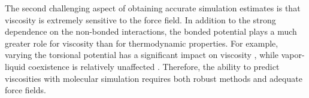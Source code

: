 \documentclass[preprint,review,12pt]{elsarticle}
\begin{document}
	The second challenging aspect of obtaining accurate simulation estimates is that viscosity is extremely sensitive to the force field. In addition to the strong dependence on the non-bonded interactions, the bonded potential plays a much greater role for viscosity than for thermodynamic properties. For example, varying the torsional potential has a significant impact on viscosity \cite{Nieto2006}, while vapor-liquid coexistence is relatively unaffected \cite{Bernard2009}. Therefore, the ability to predict viscosities with molecular simulation requires both robust methods and adequate force fields. 
	
	
	
	

	 
\end{document}
